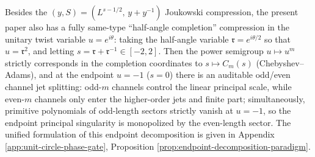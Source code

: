 \begin{remark}\label{rem:xi-half-angle-endpoint-paradigm}
Besides the \((y,S)=(L^{s-1/2},\,y+y^{-1})\) Joukowski compression, the present paper also has a fully same-type ``half-angle completion'' compression in the unitary twist variable \(u=e^{i\theta}\): taking the half-angle variable \(\mathfrak{r}=e^{i\theta/2}\) so that \(u=\mathfrak{r}^2\), and letting \(s=\mathfrak{r}+\mathfrak{r}^{-1}\in[-2,2]\).
Then the power semigroup \(u\mapsto u^m\) strictly corresponds in the completion coordinates to \(s\mapsto C_m(s)\) (Chebyshev--Adams), and at the endpoint \(u=-1\) (\(s=0\)) there is an auditable odd/even channel jet splitting: odd-\(m\) channels control the linear principal scale, while even-\(m\) channels only enter the higher-order jets and finite part; simultaneously, primitive polynomials of odd-length sectors strictly vanish at \(u=-1\), so the endpoint principal singularity is monopolized by the even-length sector.
The unified formulation of this endpoint decomposition is given in Appendix \ref{app:unit-circle-phase-gate}, Proposition \ref{prop:endpoint-decomposition-paradigm}.
\end{remark}

